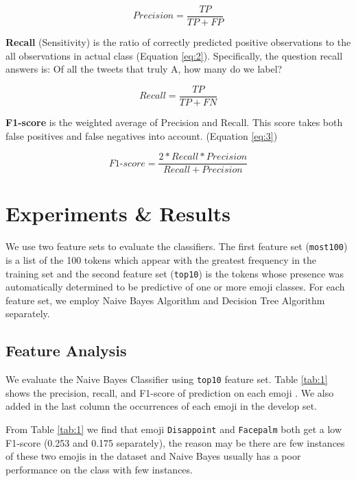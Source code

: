 \documentclass[11pt]{article}
\begin{document}
\begin{equation}\label{eq:1}
Precision = \frac{TP}{TP + FP}
\end{equation}

\noindent\textbf{Recall} (Sensitivity) is the ratio of correctly predicted positive observations to the all observations in actual class (Equation \ref{eq:2}). Specifically, the question recall answers is: Of all the tweets that truly A, how many do we label?

\begin{equation}\label{eq:2}
Recall = \frac{TP}{TP + FN}
\end{equation}

\noindent\textbf{F1-score} is the weighted average of Precision and Recall. This score takes both false positives and false negatives into account. (Equation \ref{eq:3})

\begin{equation}\label{eq:3}
F1\textrm{-}score = \frac{2*Recall*Precision}{Recall + Precision}
\end{equation}


\section{Experiments \& Results}\label{lab:res}

We use two feature sets to evaluate the classifiers. The first feature set (\texttt{most100}) is a list of the 100 tokens which appear with the greatest frequency in the training set and the second feature set (\texttt{top10}) is the tokens whose presence was automatically determined to be predictive of one or more emoji classes. For each feature set, we employ Naive Bayes Algorithm and Decision Tree Algorithm separately. 

\subsection{Feature Analysis}
We evaluate the Naive Bayes Classifier using \texttt{top10} feature set. Table \ref{tab:1} shows the precision, recall,  and F1-score  of prediction on each emoji . We also added in the last column the occurrences of each emoji in the develop set.

From Table \ref{tab:1} we find that emoji \texttt{Disappoint} and \texttt{Facepalm} both get a low F1-score (0.253 and 0.175 separately), the reason may be there are few instances of these two emojis in the dataset and Naive Bayes usually has a poor performance on the class with few instances. 
\end{document}
